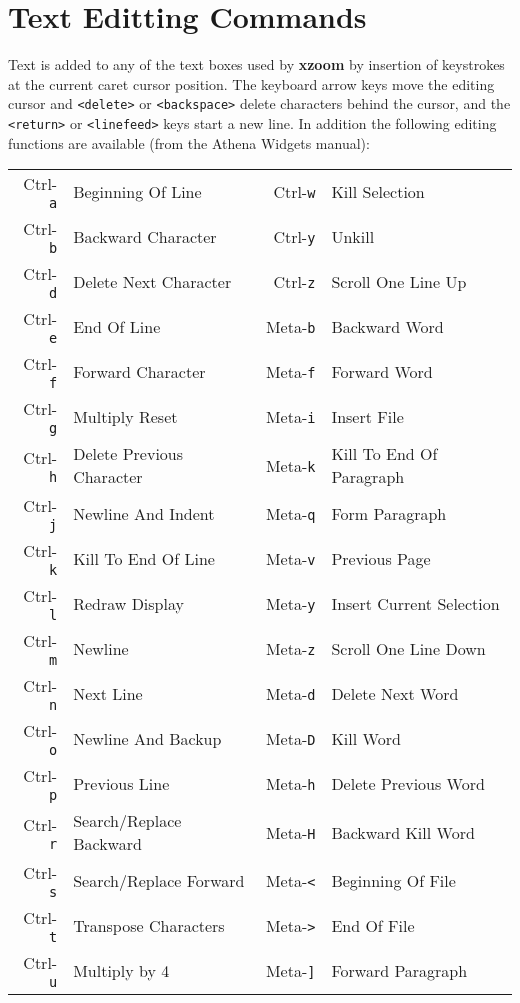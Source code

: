 
\newpage
\section{Text Editting Commands}
Text is added to any of the text boxes used by {\bf xzoom}
by insertion of keystrokes at the current caret cursor position.
The keyboard arrow keys move the editing cursor
and {\tt <delete>} or {\tt <backspace>} delete characters behind
the cursor,
and the {\tt <return>} or {\tt <linefeed>} keys start a new line.
In addition the following
editing functions are available (from the Athena Widgets manual):
\begin{center}
\begin{tabular}{r l|r l}
Ctrl-\verb.a.&Beginning Of Line&Ctrl-\verb.w.&Kill Selection \\
Ctrl-\verb.b.&Backward Character&Ctrl-\verb.y.&Unkill \\
Ctrl-\verb.d.&Delete Next Character&Ctrl-\verb.z.&Scroll One Line Up \\
Ctrl-\verb.e.&End Of Line&Meta-\verb.b.&Backward Word \\
Ctrl-\verb.f.&Forward Character&Meta-\verb.f.&Forward Word \\
Ctrl-\verb.g.&Multiply Reset&Meta-\verb.i.&Insert File \\
Ctrl-\verb.h.&Delete Previous Character&Meta-\verb.k.&Kill To End Of Paragraph \\
Ctrl-\verb.j.&Newline And Indent&Meta-\verb.q.&Form Paragraph \\
Ctrl-\verb.k.&Kill To End Of Line&Meta-\verb.v.&Previous Page \\
Ctrl-\verb.l.&Redraw Display&Meta-\verb.y.&Insert Current Selection \\
Ctrl-\verb.m.&Newline&Meta-\verb.z.&Scroll One Line Down \\
Ctrl-\verb.n.&Next Line&Meta-\verb.d.&Delete Next Word \\
Ctrl-\verb.o.&Newline And Backup&Meta-\verb.D.&Kill Word \\
Ctrl-\verb.p.&Previous Line&Meta-\verb.h.&Delete Previous Word \\
Ctrl-\verb.r.&Search/Replace Backward&Meta-\verb.H.&Backward Kill Word \\
Ctrl-\verb.s.&Search/Replace Forward&Meta-\verb.<.&Beginning Of File \\
Ctrl-\verb.t.&Transpose Characters&Meta-\verb.>.&End Of File \\
Ctrl-\verb.u.&Multiply by 4&Meta-\verb.].&Forward Paragraph \\

\end{tabular}
\end{center}
